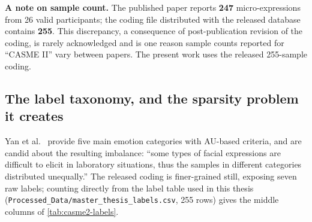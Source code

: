 \textbf{A note on sample count.} The published paper reports \textbf{247} micro-expressions from 26 valid participants; the coding file distributed with the released database contains \textbf{255}. This discrepancy, a consequence of post-publication revision of the coding, is rarely acknowledged and is one reason sample counts reported for ``CASME II'' vary between papers. The present work uses the released 255-sample coding.

\subsection{The label taxonomy, and the sparsity problem it creates}
\label{sec:label-taxonomy}

Yan et al.~\cite{yan2014} provide five main emotion categories with AU-based criteria, and are candid about the resulting imbalance: ``some types of facial expressions are difficult to elicit in laboratory situations, thus the samples in different categories distributed unequally.'' The released coding is finer-grained still, exposing seven raw labels; counting directly from the label table used in this thesis (\texttt{Processed\_Data/master\_thesis\_labels.csv}, 255 rows) gives the middle columns of \autoref{tab:casme2-labels}.


